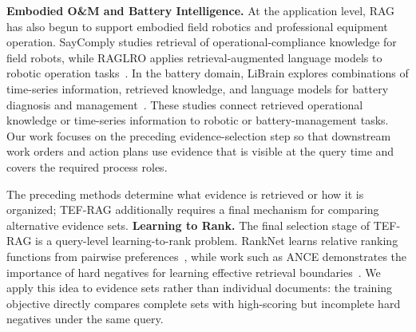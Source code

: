 \textbf{Embodied O\&M and Battery Intelligence.}
At the application level, RAG has also begun to support embodied field robotics and professional equipment operation. SayComply studies retrieval of operational-compliance knowledge for field robots, while RAGLRO applies retrieval-augmented language models to robotic operation tasks~\cite{ginting2025saycomply,wang2026raglro}. In the battery domain, LiBrain explores combinations of time-series information, retrieved knowledge, and language models for battery diagnosis and management~\cite{li2026librain}. These studies connect retrieved operational knowledge or time-series information to robotic or battery-management tasks. Our work focuses on the preceding evidence-selection step so that downstream work orders and action plans use evidence that is visible at the query time and covers the required process roles.

The preceding methods determine what evidence is retrieved or how it is organized; TEF-RAG additionally requires a final mechanism for comparing alternative evidence sets.
\textbf{Learning to Rank.}
The final selection stage of TEF-RAG is a query-level learning-to-rank problem. RankNet learns relative ranking functions from pairwise preferences~\cite{burges2005ranknet}, while work such as ANCE demonstrates the importance of hard negatives for learning effective retrieval boundaries~\cite{xiong2021ance}. We apply this idea to evidence sets rather than individual documents: the training objective directly compares complete sets with high-scoring but incomplete hard negatives under the same query.

